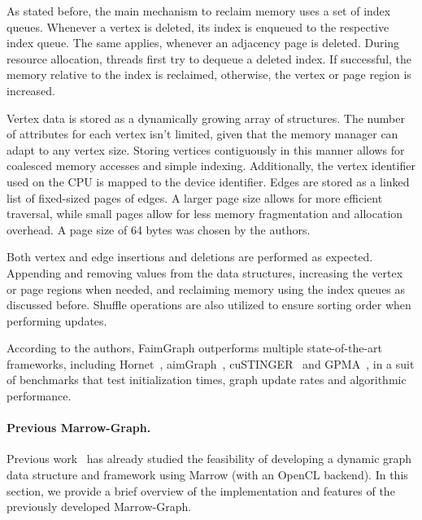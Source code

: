     As stated before, the main mechanism to reclaim memory uses a set of index queues. Whenever a vertex is deleted, its index is enqueued to the respective index queue. The same applies, whenever an adjacency page is deleted. During resource allocation, threads first try to dequeue a deleted index. If successful, the memory relative to the index is reclaimed, otherwise, the vertex or page region is increased.

    Vertex data is stored as a dynamically growing array of structures. The number of attributes for each vertex isn't limited, given that the memory manager can adapt to any vertex size. Storing vertices contiguously in this manner allows for coalesced memory accesses and simple indexing. Additionally, the vertex identifier used on the \gls{CPU} is mapped to the device identifier. Edges are stored as a linked list of fixed-sized pages of edges. A larger page size allows for more efficient traversal, while small pages allow for less memory fragmentation and allocation overhead. A page size of 64 bytes was chosen by the authors.

    Both vertex and edge insertions and deletions are performed as expected. Appending and removing values from the data structures, increasing the vertex or page regions when needed, and reclaiming memory using the index queues as discussed before. Shuffle operations are also utilized to ensure sorting order when performing updates.

    According to the authors, FaimGraph outperforms multiple state-of-the-art frameworks, including Hornet~\cite{paper:hornet}, aimGraph~\cite{paper:aimgraph}, cuSTINGER~\cite{paper:custinger} and GPMA~\cite{paper:gpma}, in a suit of benchmarks that test initialization times, graph update rates and algorithmic performance.


    \paragraph{\textbf{Previous Marrow-Graph}.}
    Previous work~\cite{marrow_graph} has already studied the feasibility of developing a dynamic graph data structure and framework using Marrow (with an OpenCL backend). In this section, we provide a brief overview of the implementation and features of the previously developed Marrow-Graph.
    
